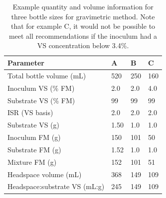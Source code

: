 \documentclass[]{article}
\begin{document}
\begin{table}[h] 
\centering
\caption{Example quantity and volume information for three bottle sizes for gravimetric method. Note that for example C, it would not be possible to meet all recommendations if the inoculum had a VS concentration below 3.4\%.}
\label{tab:examples}
\begin{tabular}{llll}
\hline
Parameter                     & A    & B   & C   \\
\hline
Total bottle volume (mL)      & 520  & 250 & 160 \\
Inoculum VS (\% FM)           & 2.0  & 2.0 & 4.0 \\
Substrate VS (\% FM)          & 99   & 99  & 99  \\
ISR (VS basis)                & 2.0  & 2.0 & 2.0 \\
Substrate VS (g)              & 1.50 & 1.0 & 1.0 \\
Inoculum FM (g)               & 150  & 101 & 50  \\
Substrate FM (g)              & 1.52 & 1.0 & 1.0 \\
Mixture FM (g)                & 152  & 101 & 51  \\
Headspace volume (mL)         & 368  & 149 & 109 \\
Headspace:substrate VS (mL:g) & 245  & 149 & 109 \\
\hline
\end{tabular}
\end{table}
\end{document}
